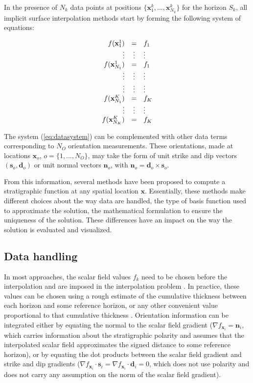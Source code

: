\documentclass[final]{ring20}
\newcommand{\bx}{\mathbf{x}}
\newcommand{\bn}{\mathbf{n}}
\begin{document}
In the presence of $N_k$ data points at positions $\{\mathbf{x}_1^k, \ldots, \mathbf{x}_{N_k}^k\}$ for the horizon $S_k$, all implicit surface interpolation methods start by forming the following system of equations: 

\begin{equation}
\label{eq:datasystem}
\begin{array}{r c l}
f(\bx_1^1) & = & f_1 \\
\vdots & \vdots & \vdots \\
f(\bx_{N_1}^1) & = & f_1 \\
\vdots & \vdots & \vdots \\
\vdots & \vdots & \vdots \\
f(\bx_{N_1}^K) & = & f_K \\
\vdots & \vdots & \vdots \\
f(\bx_{N_K}^K) & = & f_K \\
\end{array}
\end{equation}

The system (\ref{eq:datasystem}) can be complemented with other data terms corresponding to $N_O$ orientation measurements. These orientations, made at locations 
$\bx_o$, $o = \{1, \ldots, N_O\}$, may take the form of unit strike and dip vectors $(\mathbf{s}_o, \mathbf{d}_o)$ or unit normal vectors $\bn_o$, with $\mathbf{n}_o = \mathbf{d}_o \times \mathbf{s}_o$.  
 
From this information, several methods have been proposed to compute a stratigraphic function at any spatial location $\mathbf{x}$. Essentially, these methods make different choices about the way data are handled, the type of basis function used to approximate the solution, the mathematical formulation to ensure the uniqueness of the solution. These differences have an impact on the way the solution is evaluated and visualized. 
 
\subsection {Data handling}

In most approaches, the scalar field values $f_k$ need to be chosen before the interpolation and are imposed in the interpolation problem \citep[e.g., ][]{Frank2007CG,Hillier2014MG,Renaudeau2019MG}. In practice, these values can be chosen using a rough estimate of the cumulative thickness between each horizon and some reference horizon, or any other convenient value proportional to that cumulative thickness \citep{Caumon2013GaRSITo,Collon2016I}. Orientation information can be integrated either by equating the normal to the scalar field gradient ($\nabla f_{\bx_i} = \mathbf{n}_i$, which  carries information about the stratigraphic polarity and assumes that the interpolated scalar field approximates the signed distance to some reference horizon), or by equating the dot products between the scalar field gradient and strike and dip gradients ($\nabla f_{\bx_i} \cdot \mathbf{s}_i = \nabla f_{\bx_i} \cdot \mathbf{d}_i = 0$, which does not use polarity and does not carry any assumption on the norm of the scalar field gradient). 
\end{document}
